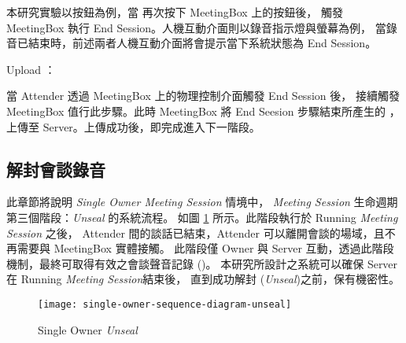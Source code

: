 \begin{steps}
            本研究實驗以按鈕為例，當 \DEFattender 再次按下 MeetingBox 上的按鈕後，
        觸發 MeetingBox 執行 End Session。人機互動介面則以錄音指示燈與螢幕為例，
        當錄音已結束時，前述兩者人機互動介面將會提示當下系統狀態為 End Session。

    \item Upload \DEFrecJ：

            當 Attender 透過 MeetingBox 上的物理控制介面觸發 End Session 後，
        接續觸發 MeetingBox 值行此步驟。此時 MeetingBox 將 End Seesion 步驟結束所產生的 \DEFrecJ，
        上傳至 Server。上傳成功後，即完成進入下一階段。
\end{steps}


\subsection{解封會談錄音}
\label{subsec:unseal}

    此章節將說明 {\it Single Owner Meeting Session} 情境中，
{\it Meeting Session} 生命週期第三個階段：{\it Unseal} 的系統流程。
如圖 \ref{fig:s-o-unseal} 所示。此階段執行於 Running {\it Meeting Session} 之後，
Attender 間的談話已結束，Attender 可以離開會談的場域，且不再需要與 MeetingBox 實體接觸。
此階段僅 Owner 與 Server 互動，透過此階段機制，最終可取得有效之會談聲音記錄 (\DEFrecREV)。
本研究所設計之系統可以確保 Server 在 Running {\it Meeting Session}結束後，
直到成功解封 ({\it Unseal})之前，\DEFrecREV 保有機密性。

\begin{figure}[H]
    \centering
    \texttt{[image: single-owner-sequence-diagram-unseal]}
    \caption{Single Owner {\it Unseal}}
    \label{fig:s-o-unseal}
\end{figure}

